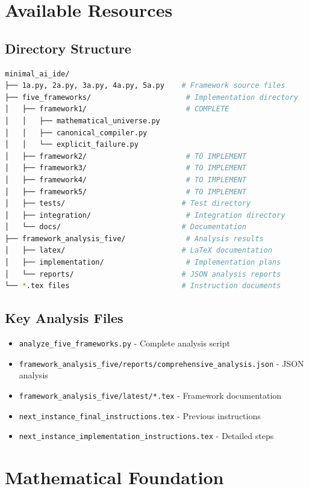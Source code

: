\documentclass[12pt]{article}
\begin{document}
\section{Available Resources}

\subsection{Directory Structure}
\begin{lstlisting}[language=bash]
minimal_ai_ide/
├── 1a.py, 2a.py, 3a.py, 4a.py, 5a.py    # Framework source files
├── five_frameworks/                      # Implementation directory
│   ├── framework1/                       # COMPLETE
│   │   ├── mathematical_universe.py
│   │   ├── canonical_compiler.py
│   │   └── explicit_failure.py
│   ├── framework2/                       # TO IMPLEMENT
│   ├── framework3/                       # TO IMPLEMENT
│   ├── framework4/                       # TO IMPLEMENT
│   ├── framework5/                       # TO IMPLEMENT
│   ├── tests/                           # Test directory
│   ├── integration/                      # Integration directory
│   └── docs/                            # Documentation
├── framework_analysis_five/              # Analysis results
│   ├── latex/                           # LaTeX documentation
│   ├── implementation/                   # Implementation plans
│   └── reports/                         # JSON analysis reports
└── *.tex files                          # Instruction documents
\end{lstlisting}

\subsection{Key Analysis Files}
\begin{itemize}
    \item \texttt{analyze\_five\_frameworks.py} - Complete analysis script
    \item \texttt{framework\_analysis\_five/reports/comprehensive\_analysis.json} - JSON analysis
    \item \texttt{framework\_analysis\_five/latest/*.tex} - Framework documentation
    \item \texttt{next\_instance\_final\_instructions.tex} - Previous instructions
    \item \texttt{next\_instance\_implementation\_instructions.tex} - Detailed steps
\end{itemize}

\section{Mathematical Foundation}
\end{document}
